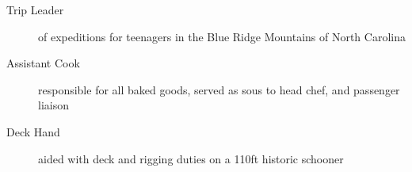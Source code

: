 \documentclass[a4paper]{deedy-resume} %
\begin{document}
    \iftrue

    \begin{description}
        \item[Trip Leader] of expeditions for teenagers in the Blue Ridge Mountains of North Carolina
    
    \iffalse 
    \begin{itemize}
        \item planned and guided backpacking trips
        \item responded to any medical issues
        \item drove passenger van with gear trailer
    \end{itemize}
    
    \fi
    \end{description}


    \fi

    
    \iftrue
    
    \begin{description}
    \item[Assistant Cook] responsible for all baked goods, served as sous to head chef, and passenger liaison 
    
    \iffalse 
    \begin{itemize}
        \item baked bread, snacks, desserts and pastries starting at 4:30am
        \item washed all dishes and clean galley every night
        \item shopped for 6 days of provisions for 36 people and accommodated food allergies when needed
    \end{itemize}
    \fi

    \item[Deck Hand] aided with deck and rigging duties on a 110ft historic schooner
    
    \iffalse 
    \begin{itemize}
        \item assisted throughout 10 day sail from Maine to Boston
        \item thorough knowledge of the rigging of sailboats both layout and use
        \item person overboard rescue procedures
    \end{itemize}
    \fi

    \end{description}
\end{document}
